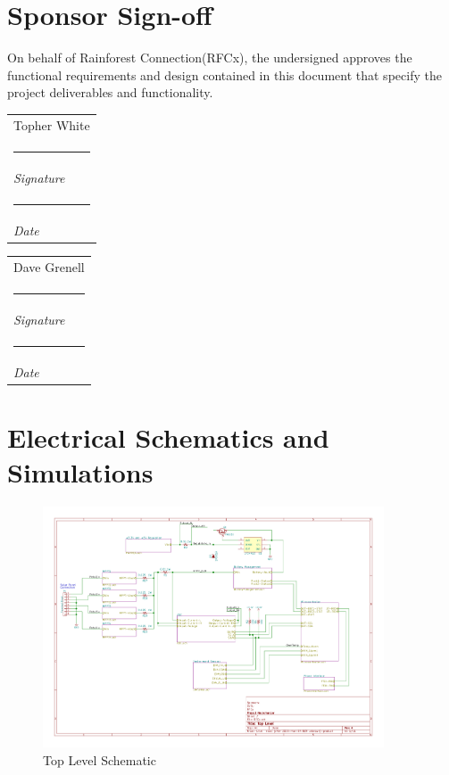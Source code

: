 \documentclass{article}
\makeatletter
\numberwithin{figure}{section}
\numberwithin{equation}{section}
\let\oldappendix\appendix %
\renewcommand\appendix{%
    \oldappendix
    \newcommand{\section@cntformat}{\appendixname~\thesection\quad}
}
\newcommand{\namesigdate}[2][5cm]{%
  \begin{tabular}{@{}p{#1}@{}}
    #2 \\[2\normalbaselineskip] \hrule \\[0pt]
    {\small \textit{Signature}} \\[2\normalbaselineskip] \hrule \\[0pt]
    {\small \textit{Date}}
  \end{tabular}
}
\makeatother
\begin{document}
{\newpage
\section{Sponsor Sign-off}
On behalf of Rainforest Connection(RFCx), the undersigned  approves the functional requirements and design contained in this document that specify the project deliverables and functionality.

\bigskip

\bigskip
\noindent \namesigdate{Topher White} \hfill \namesigdate{Dave Grenell}


\newpage
\vspace*{\fill}
\section*{}
\vspace*{\fill}
\newpage
\appendix
\section{Electrical Schematics and Simulations} \label{sect:appendixA}

\begin{figure}[H]
	\centering
	\includegraphics[page=1,width=0.9\textwidth]{RFCxSchematics.pdf}
	\caption{Top Level Schematic}
	\label{fig:schemp1}
\end{figure}

}
\end{document}
